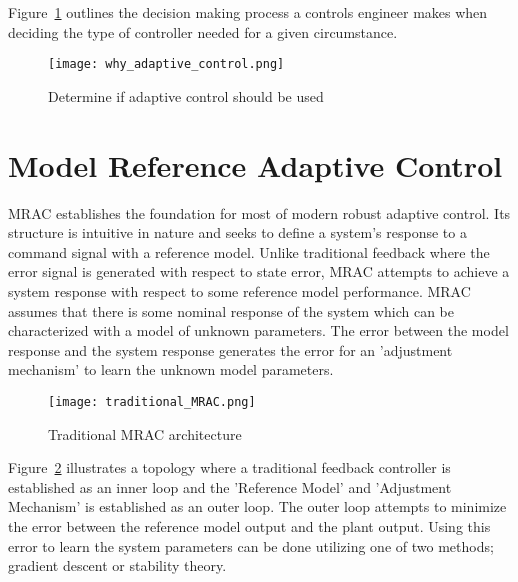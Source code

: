 Figure~\ref{fig:why_adaptive_control} outlines the decision making process a controls engineer makes when deciding the type of controller needed for a given circumstance.



\begin{figure}[h!]
 \centering
  \texttt{[image: why\_adaptive\_control.png]}
  \caption{Determine if adaptive control should be used}
  \label{fig:why_adaptive_control}
\end{figure}


\section{Model Reference Adaptive Control}
\ac{MRAC} establishes the foundation for most of modern robust adaptive control.  Its structure is intuitive in nature and seeks to define a system's response to a command signal with a reference model.  Unlike traditional feedback where the error signal is generated with respect to state error, \ac{MRAC} attempts to achieve a system response with respect to some reference model performance. \ac{MRAC} assumes that there is some nominal response of the system which can be characterized with a model of unknown parameters.  The error between the model response and the system response generates the error for an 'adjustment mechanism' to learn the unknown model parameters.

\begin{figure}[h!]
 \centering
  \texttt{[image: traditional\_MRAC.png]}
  \caption{Traditional \ac{MRAC} architecture }
  \label{fig:traditional_mrac}
\end{figure}

Figure~\ref{fig:traditional_mrac} illustrates a topology where a traditional feedback controller is established as an inner loop and the 'Reference Model' and 'Adjustment Mechanism' is established as an outer loop.  The outer loop attempts to minimize the error between the reference model output and the plant output.  Using this error to learn the system parameters can be done utilizing one of two methods; gradient descent or stability theory.

